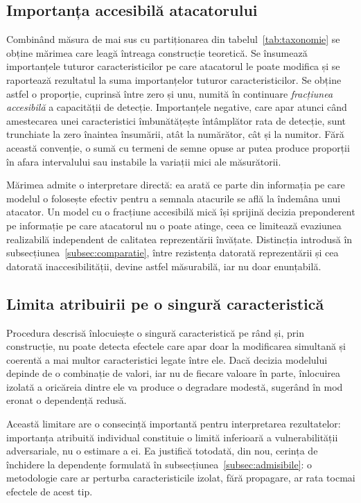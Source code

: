 \subsection{Importanța accesibilă atacatorului}\label{subsec:accesibila}

Combinând măsura de mai sus cu partiționarea din tabelul~\ref{tab:taxonomie} se obține mărimea care leagă întreaga construcție teoretică. Se însumează importanțele tuturor caracteristicilor pe care atacatorul le poate modifica și se raportează rezultatul la suma importanțelor tuturor caracteristicilor. Se obține astfel o proporție, cuprinsă între zero și unu, numită în continuare \emph{fracțiunea accesibilă} a capacității de detecție. Importanțele negative, care apar atunci când amestecarea unei caracteristici îmbunătățește întâmplător rata de detecție, sunt trunchiate la zero înaintea însumării, atât la numărător, cât și la numitor. Fără această convenție, o sumă cu termeni de semne opuse ar putea produce proporții în afara intervalului sau instabile la variații mici ale măsurătorii.

Mărimea admite o interpretare directă: ea arată ce parte din informația pe care modelul o folosește efectiv pentru a semnala atacurile se află la îndemâna unui atacator. Un model cu o fracțiune accesibilă mică își sprijină decizia preponderent pe informație pe care atacatorul nu o poate atinge, ceea ce limitează evaziunea realizabilă independent de calitatea reprezentării învățate. Distincția introdusă în subsecțiunea~\ref{subsec:comparatie}, între rezistența datorată reprezentării și cea datorată inaccesibilității, devine astfel măsurabilă, iar nu doar enunțabilă.

\subsection{Limita atribuirii pe o singură caracteristică}\label{subsec:limita}

Procedura descrisă înlocuiește o singură caracteristică pe rând și, prin construcție, nu poate detecta efectele care apar doar la modificarea simultană și coerentă a mai multor caracteristici legate între ele. Dacă decizia modelului depinde de o combinație de valori, iar nu de fiecare valoare în parte, înlocuirea izolată a oricăreia dintre ele va produce o degradare modestă, sugerând în mod eronat o dependență redusă.

Această limitare are o consecință importantă pentru interpretarea rezultatelor: importanța atribuită individual constituie o limită inferioară a vulnerabilității adversariale, nu o estimare a ei. Ea justifică totodată, din nou, cerința de închidere la dependențe formulată în subsecțiunea~\ref{subsec:admisibile}: o metodologie care ar perturba caracteristicile izolat, fără propagare, ar rata tocmai efectele de acest tip.

